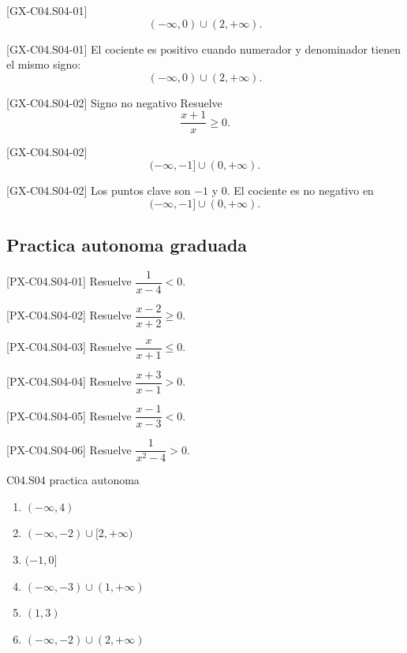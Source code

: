 \begin{shortanswer}{[GX-C04.S04-01]}
\[
(-\infty,0)\cup (2,+\infty).
\]
\end{shortanswer}

\begin{fullsolution}{[GX-C04.S04-01]}
El cociente es positivo cuando numerador y denominador tienen el mismo signo:
\[
(-\infty,0)\cup (2,+\infty).
\]
\end{fullsolution}

\begin{guidedexercise}{[GX-C04.S04-02] Signo no negativo}
Resuelve
\[
\frac{x+1}{x}\geq 0.
\]
\end{guidedexercise}

\begin{shortanswer}{[GX-C04.S04-02]}
\[
(-\infty,-1]\cup (0,+\infty).
\]
\end{shortanswer}

\begin{fullsolution}{[GX-C04.S04-02]}
Los puntos clave son \(-1\) y \(0\). El cociente es no negativo en
\[
(-\infty,-1]\cup (0,+\infty).
\]
\end{fullsolution}

\subsection*{Practica autonoma graduada}
\begin{exercise}{[PX-C04.S04-01] Resuelve \(\dfrac{1}{x-4}<0\).}
\end{exercise}
\begin{exercise}{[PX-C04.S04-02] Resuelve \(\dfrac{x-2}{x+2}\geq 0\).}
\end{exercise}
\begin{exercise}{[PX-C04.S04-03] Resuelve \(\dfrac{x}{x+1}\leq 0\).}
\end{exercise}
\begin{exercise}{[PX-C04.S04-04] Resuelve \(\dfrac{x+3}{x-1}>0\).}
\end{exercise}
\begin{exercise}{[PX-C04.S04-05] Resuelve \(\dfrac{x-1}{x-3}<0\).}
\end{exercise}
\begin{exercise}{[PX-C04.S04-06] Resuelve \(\dfrac{1}{x^2-4}>0\).}
\end{exercise}

\begin{shortanswer}{C04.S04 practica autonoma}
\begin{enumerate}[label=\textbf{PX-C04.S04-\arabic*:}, leftmargin=*]
  \item \((-\infty,4)\)
  \item \((-\infty,-2)\cup [2,+\infty)\)
  \item \((-1,0]\)
  \item \((-\infty,-3)\cup (1,+\infty)\)
  \item \((1,3)\)
  \item \((-\infty,-2)\cup (2,+\infty)\)
\end{enumerate}
\end{shortanswer}

